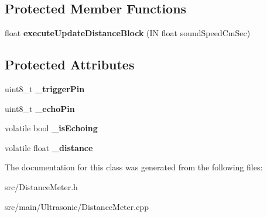 \subsection*{Protected Member Functions}
\begin{DoxyCompactItemize}
\item 
\mbox{\label{class_easyuino_1_1_distance_meter_aeb3b9b39f19ff88ab798b6b0c3ba7d0d}} 
float {\bfseries execute\+Update\+Distance\+Block} (IN float sound\+Speed\+Cm\+Sec)
\end{DoxyCompactItemize}
\subsection*{Protected Attributes}
\begin{DoxyCompactItemize}
\item 
\mbox{\label{class_easyuino_1_1_distance_meter_a39f2305fe998cd3212eef389dfe036fe}} 
uint8\+\_\+t {\bfseries \+\_\+trigger\+Pin}
\item 
\mbox{\label{class_easyuino_1_1_distance_meter_a6f4a18c48dc147102f1fae8cb12e24a2}} 
uint8\+\_\+t {\bfseries \+\_\+echo\+Pin}
\item 
\mbox{\label{class_easyuino_1_1_distance_meter_ae2b9e4d3e8704c8f1a73639afd53614d}} 
volatile bool {\bfseries \+\_\+is\+Echoing}
\item 
\mbox{\label{class_easyuino_1_1_distance_meter_ae10df1a21d2acfec3aa3eef57ea3a632}} 
volatile float {\bfseries \+\_\+distance}
\end{DoxyCompactItemize}


The documentation for this class was generated from the following files\+:\begin{DoxyCompactItemize}
\item 
src/Distance\+Meter.\+h\item 
src/main/\+Ultrasonic/Distance\+Meter.\+cpp\end{DoxyCompactItemize}
